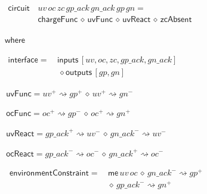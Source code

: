 \documentclass[british,compsoc]{IEEEtran}
\begin{document}
\begin{minipage}[h]{1\columnwidth}%

\begin{flushleft}
$\begin{aligned}\mathsf{circuit}&\,uv \,oc \,zc \,gp\_ack \,gn\_ack \,gp \,gn= \\
& \,\mathsf{chargeFunc}\,\diamond\,\mathsf{uvFunc}\,\diamond\,\mathsf{uvReact}\,\diamond
\,\mathsf{zcAbsent}
\end{aligned}
$
\par\end{flushleft}%

\par\begin{flushleft}
$\mathsf{where}$
\par\end{flushleft}

\begin{flushleft}
$\begin{aligned}\mathsf{interface}=\,&\mathsf{inputs}\,[uv, oc, zc, gp\_ack, gn\_ack]\\
& \,\diamond \mathsf{outputs}\,[gp, gn]
\end{aligned}$
\par\end{flushleft}%

\begin{flushleft}
$\,\mathsf{uvFunc}=uv^{+}\rightsquigarrow gp^{+}\,\diamond\, uv^{+}\rightsquigarrow gn^{-}$
\par\end{flushleft}

\begin{flushleft}
$\,\mathsf{ocFunc}=oc^{+}\rightsquigarrow gp^{-}\,\diamond\, oc^{+}\rightsquigarrow gn^{+}$
\par\end{flushleft}

\begin{flushleft}
$\,\mathsf{uvReact}=gp\_ack^{+}\rightsquigarrow uv^{-}\,\diamond\, gn\_ack^{-}\rightsquigarrow uv^{-}$
\par\end{flushleft}

\begin{flushleft}
$\,\mathsf{ocReact}=gp\_ack^{-}\rightsquigarrow oc^{-}\,\diamond\, gn\_ack^{+}\rightsquigarrow oc^{-}$
\par\end{flushleft}

\begin{flushleft}
$\begin{aligned}\,\mathsf{environmentConstraint}=&\,\mathsf{me}\,uv\, oc \,\diamond\, gn\_ack^{-}\rightsquigarrow gp^{+}\\ &\,\diamond\, gp\_ack^{-}\rightsquigarrow gn^{+}
\end{aligned}$
\par\end{flushleft}


\end{minipage}
\end{document}
